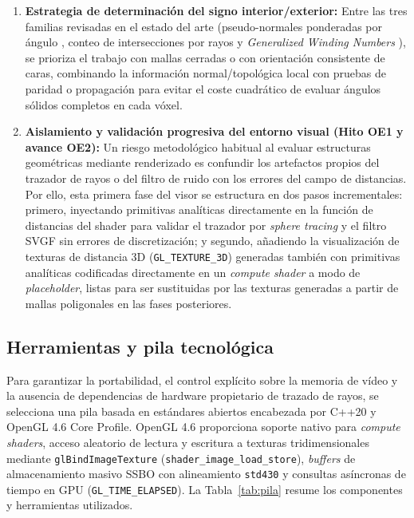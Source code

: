 \begin{enumerate}
  \item \textbf{Estrategia de determinación del signo interior/exterior:} Entre las tres familias revisadas en el estado del arte (pseudo-normales ponderadas por ángulo \cite{baerentzen2005}, conteo de intersecciones por rayos y \textit{Generalized Winding Numbers} \cite{jacobson2013}), se prioriza el trabajo con mallas cerradas o con orientación consistente de caras, combinando la información normal/topológica local con pruebas de paridad o propagación para evitar el coste cuadrático de evaluar ángulos sólidos completos en cada vóxel.
  \item \textbf{Aislamiento y validación progresiva del entorno visual (Hito OE1 y avance OE2):} Un riesgo metodológico habitual al evaluar estructuras geométricas mediante renderizado es confundir los artefactos propios del trazador de rayos o del filtro de ruido con los errores del campo de distancias. Por ello, esta primera fase del visor se estructura en dos pasos incrementales: primero, inyectando primitivas analíticas directamente en la función de distancias del shader para validar el trazador por \textit{sphere tracing} y el filtro SVGF sin errores de discretización; y segundo, añadiendo la visualización de texturas de distancia 3D (\texttt{GL\_TEXTURE\_3D}) generadas también con primitivas analíticas codificadas directamente en un \textit{compute shader} a modo de \textit{placeholder}, listas para ser sustituidas por las texturas generadas a partir de mallas poligonales en las fases posteriores.
\end{enumerate}

\subsection{Herramientas y pila tecnológica}

Para garantizar la portabilidad, el control explícito sobre la memoria de vídeo y la ausencia de dependencias de hardware propietario de trazado de rayos, se selecciona una pila basada en estándares abiertos encabezada por C++20 y OpenGL 4.6 Core Profile. OpenGL 4.6 proporciona soporte nativo para \textit{compute shaders}, acceso aleatorio de lectura y escritura a texturas tridimensionales mediante \texttt{glBindImageTexture} (\texttt{shader\_image\_load\_store}), \textit{buffers} de almacenamiento masivo SSBO con alineamiento \texttt{std430} y consultas asíncronas de tiempo en GPU (\texttt{GL\_TIME\_ELAPSED}). La Tabla~\ref{tab:pila} resume los componentes y herramientas utilizados.


